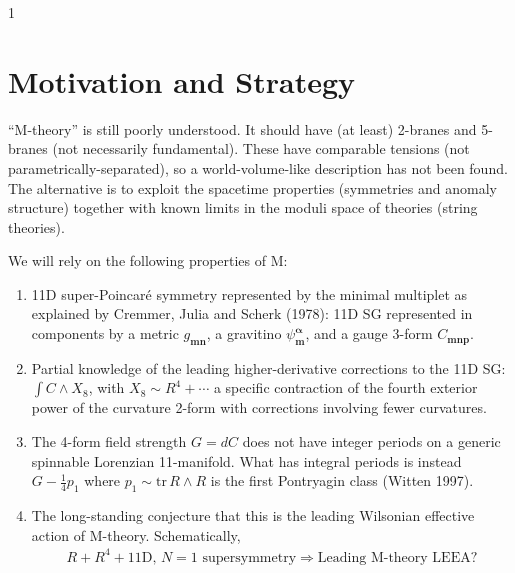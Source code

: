 \documentclass[letter,12pt]{article} %
\begin{document}
\thispagestyle{empty}
\newpage
\tableofcontents

\setcounter{page}1
%
\section{Motivation and Strategy}

``M-theory'' is still poorly understood.
It should have (at least) 2-branes and 5-branes (not necessarily fundamental). These have comparable tensions (not parametrically-separated), so a world-volume-like description has not been found.\\
The alternative is to exploit the spacetime properties (\eg symmetries and anomaly structure) together with known limits in the moduli space of theories (\ie string theories). 

We will rely on the following properties of M:
\begin{enumerate}
\item 11D super-Poincar\'e symmetry represented by the minimal multiplet as explained by Cremmer, Julia and Scherk (1978): 11D SG represented in components by a metric $g_{\bm {mn}}$, a gravitino $\psi_{\bm m}^{\bm \alpha}$, and a gauge 3-form $C_{\bm {mnp}}$. 
\item Partial knowledge of the leading higher-derivative corrections to the 11D SG: $\int C \wedge X_8$, with $X_8 \sim R^4+\cdots$ a specific contraction of the fourth exterior power of the curvature 2-form with corrections involving fewer curvatures.
\item The 4-form field strength $G=dC$ does not have integer periods on a generic spinnable Lorenzian 11-manifold. What has integral periods is instead $G - \tfrac14 p_1$ where $p_1 \sim \mathrm{tr} \, R\wedge R$ is the first Pontryagin class (Witten 1997).
\item The long-standing conjecture that this is the leading Wilsonian effective action of M-theory. Schematically,
{%
\begin{align}
\label{E:MLEEA}
\boxed{R + R^4 + \textrm{11D, $N=1$ supersymmetry} \Rightarrow \textrm{Leading M-theory LEEA?}}
\tag{$\ast$}
\end{align}}
\end{enumerate}
\end{document}
